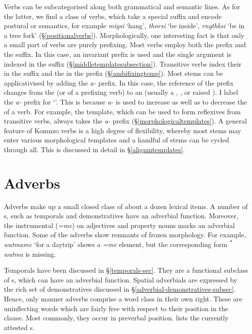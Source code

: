 Verbs can be subcategorised along both grammatical and semantic lines. As for the latter, we find a class of  verbs, which take a special  suffix and encode postural or  semantics, for example \emph{migsi} `hang', \emph{thorsi} `be inside', \emph{rngthksi} `be in a tree fork' ({\S}\ref{positionalverbs}). Morphologically, one interesting fact is that only a small part of  verbs are purely prefixing. Most  verbs employ both the prefix and the suffix. In this case, an invariant  prefix is used and the single argument is indexed in the suffix ({\S}\ref{middletemplatesubsection}). Transitive verbs index their  in the suffix and the  in the prefix ({\S}\ref{ambifixingtemp}). Most stems can be applicativised by adding the \emph{a-} prefix. In this case, the reference of the  prefix changes from the  (or  of a prefixing verb) to an  (usually a , , or raised ). I label the \emph{a-} prefix {\Vc} for `'. This is because \emph{a-} is used to increase as well as to decrease the  of a verb. For example, the  template, which can be used to form reflexives from transitive verbs, always takes the \emph{a-} prefix (\S\ref{morphologicaltemplates}). A general feature of Komnzo verbs is a high degree of flexibility, whereby most stems may enter various morphological templates and a handful of stems can be cycled through all. This is discussed in detail in {\S}\ref{alignmtemplates}.

\section{Adverbs} \label{adverbs-sec}

Adverbs make up a small closed class of about a dozen lexical items. A number of s, such as temporals and demonstratives have an adverbial function. Moreover, the instrumental  (\emph{=me}) on adjectives and property nouns marks an adverbial function. Some of the adverbs show remnants of frozen morphology. For example, \emph{watmame} `for a daytrip' shows a \emph{=me} element, but the corresponding form \textsuperscript{$\ast$}\emph{watma} is missing.

Temporals have been discussed in {\S}\ref{temporals-sec}. They are a functional subclass of s, which can have an adverbial function. Spatial adverbials are expressed by the rich set of demonstratives discussed in {\S}\ref{adverbial-demonstratives-subsec}. Hence, only manner adverbs comprise a word class in their own right. These are uninflecting words which are fairly free with respect to their position in the clause. Most commonly, they occur in preverbal position.  lists the currently attested s.

